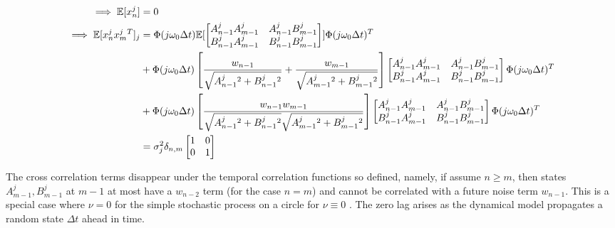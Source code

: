 \begin{align}
\implies \mathbb{E}[x^j_n] &= 0 \\
\implies \mathbb{E}[x^j_n x^j_m{}^T]_j & =   \Phi(j \omega_0 \Delta t) \mathbb{E}[\begin{bmatrix} A^j_{n-1}A^j_{m-1} & A^j_{n-1}B^j_{m-1}\\ B^j_{n-1}A^j_{m-1} & B^j_{n-1}B^j_{m-1}\\ \end{bmatrix}] \Phi(j \omega_0 \Delta t)^T \label{eqn:cov_kf_term1}\\
& +   \Phi(j \omega_0 \Delta t) \left[\frac{w_{n-1}}{\sqrt{A^j_{n-1}{}^2 + B^j_{n-1}{}^2}} + \frac{w_{m-1}}{\sqrt{A^j_{m-1}{}^2 + B^j_{m-1}{}^2}} \right]\begin{bmatrix} A^j_{n-1}A^j_{m-1} & A^j_{n-1}B^j_{m-1}\\ B^j_{n-1}A^j_{m-1} & B^j_{n-1}B^j_{m-1}\\ \end{bmatrix} \Phi(j \omega_0 \Delta t)^T  \label{eqn:cov_kf_term2}\\
& +   \Phi(j \omega_0 \Delta t) \left[\frac{w_{n-1}w_{m-1}}{\sqrt{A^j_{n-1}{}^2 + B^j_{n-1}{}^2}\sqrt{A^j_{m-1}{}^2 + B^j_{m-1}{}^2}} \right]\begin{bmatrix} A^j_{n-1}A^j_{m-1} & A^j_{n-1}B^j_{m-1}\\ B^j_{n-1}A^j_{m-1} & B^j_{n-1}B^j_{m-1}\\ \end{bmatrix} \Phi(j \omega_0 \Delta t)^T \label{eqn:cov_kf_term3} \\
& = \sigma^2_j \delta_{n,m} \begin{bmatrix} 
1 & 0 \\ 
0 & 1  \\
\end{bmatrix} \label{eqn:cov_kf_term4}
 \end{align}

The cross correlation terms disappear under the temporal correlation functions so defined, namely, if assume $n \geq m$, then states $A^j_{m-1}, B^j_{m-1}$ at $m-1$ at most have a $w_{n-2}$ term (for the case $n=m$) and cannot be correlated with a future noise term $w_{n-1}$. This is a special case where $\nu=0$ for the simple stochastic process on a circle for $\nu \equiv 0$ \cite{karlin}.  The zero lag arises as the dynamical model propagates a random state $\Delta t$ ahead in time.

